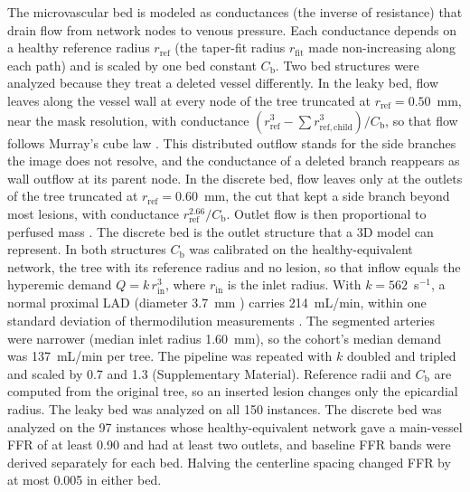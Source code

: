 \documentclass[journal,twoside,web]{ieeecolor}
\begin{document}
The microvascular bed is modeled as conductances (the inverse of resistance) that drain flow from network nodes to
venous pressure. Each conductance depends on a healthy reference radius $r_\mathrm{ref}$ (the taper-fit radius
$r_\mathrm{fit}$ made non-increasing along each path) and is scaled by one bed constant $C_\mathrm{b}$. Two bed structures were analyzed because they treat a deleted vessel differently. In the leaky
bed, flow leaves along the vessel wall at every node of the tree truncated at $r_\mathrm{ref} = 0.50$~mm, near the mask resolution, with
conductance $(r_\mathrm{ref}^3 - \sum r_{\mathrm{ref},\mathrm{child}}^3)/C_\mathrm{b}$, so that flow follows Murray's cube law
\cite{murray1926}. This distributed outflow stands for the side branches the image does not resolve, and the
conductance of a deleted branch reappears as wall outflow at its parent node. In the discrete bed, flow leaves only
at the outlets of the tree truncated at $r_\mathrm{ref} = 0.60$~mm, the cut that kept a side branch beyond most lesions, with conductance $r_\mathrm{ref}^{2.66}/C_\mathrm{b}$.
Outlet flow is then proportional to perfused mass \cite{choy2008}. The discrete bed is the outlet structure that a 3D model can
represent. In both structures $C_\mathrm{b}$ was calibrated on the healthy-equivalent network, the tree with its reference
radius and no lesion, so that inflow equals the hyperemic demand $Q = k\,r_\mathrm{in}^3$, where $r_\mathrm{in}$ is
the inlet radius. With $k = 562$~s$^{-1}$, a normal proximal LAD (diameter 3.7~mm \cite{dodge1992}) carries 214~mL/min, within one standard deviation of thermodilution measurements \cite{fournier2021}. The segmented arteries were narrower (median inlet radius 1.60~mm), so the cohort's median demand was 137~mL/min per tree. The pipeline was repeated with $k$ doubled and tripled and scaled by 0.7 and 1.3 (Supplementary Material). Reference radii and $C_\mathrm{b}$ are computed from the original tree, so an inserted lesion changes
only the epicardial radius. The leaky bed was analyzed on all 150 instances. The discrete bed was analyzed on the
97 instances whose healthy-equivalent network gave a main-vessel FFR of at least 0.90 and had at least two outlets,
and baseline FFR bands were derived separately for each bed. Halving the centerline spacing changed FFR by at most
0.005 in either bed.
\end{document}
